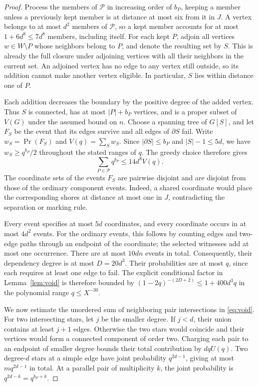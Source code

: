 \documentclass[11pt,reqno]{amsart}
\theoremstyle{remark}
\numberwithin{equation}{section}
\begin{document}
\begin{proof}
Process the members of $\mathcal P$ in increasing order of $b_P$,
keeping a member unless a previously kept member is at distance
at most six from it in $J$. A vertex belongs to at most $d^2$
members of $\mathcal P$, so a kept member accounts for at most
$1+6d^8\le7d^8$ members, including itself. For each kept $P$,
adjoin all vertices $w\in W\setminus P$ whose neighbors belong
to $P$, and denote the resulting set by $S$. This is already the
full closure under adjoining vertices with all their neighbors in
the current set. An adjoined vertex has no edge to any vertex
still outside, so its addition cannot make another vertex
eligible. In particular, $S$ lies within distance one of $P$.

Each addition decreases the boundary by the positive degree of
the added vertex. Thus $S$ is connected, has at most $|P|+b_P$
vertices, and is a proper subset of $V(G)$ under the assumed bound
on $n$. Choose a spanning tree of $G[S]$, and let $F_S$ be the
event that its edges survive and all edges of $\partial S$ fail.
Write $w_S=\Pr(F_S)$ and $V(q)=\sum_S w_S$. Since
$|\partial S|\le b_P$ and $|S|-1\le5d$, we have
$w_S\ge q^{b_P}/2$ throughout the stated ranges of $q$.
The greedy choice therefore gives
\begin{equation}\label{eq:upper-packing}
 \sum_{P\in\mathcal P}q^{b_P}\le14d^8V(q).
\end{equation}
The coordinate sets of the events $F_S$ are pairwise disjoint and
are disjoint from those of the ordinary component events. Indeed,
a shared coordinate would place the corresponding shores at
distance at most one in $J$, contradicting the separation or
marking rule.

Every event specifies at most $5d$ coordinates, and every
coordinate occurs in at most $4d^2$ events. For the ordinary
events, this follows by counting edges and two-edge paths through
an endpoint of the coordinate; the selected witnesses add at most
one occurrence. There are at most $10dn$ events in total.
Consequently, their dependency degree is at most $D=20d^3$.
Their probabilities are at most $q$, since each requires at least
one edge to fail. The explicit conditional factor in
Lemma~\ref{lem:void} is therefore bounded by
$(1-2q)^{-(2D+2)}\le1+400d^3q$ in the polynomial range
$q\le X^{-30}$.

We now estimate the unordered sum of neighboring pair
intersections in \eqref{eq:void}. For two intersecting stars, let
$j$ be the smaller degree. If $j<d$, their union contains at least
$j+1$ edges. Otherwise the two stars would coincide and their
vertices would form a connected component of order two.
Charging each pair to an endpoint of smaller degree bounds their
total contribution by $dqU(q)$. Two degree-$d$ stars at a simple
edge have joint probability $q^{2d-1}$, giving at most
$mq^{2d-1}$ in total. At a parallel pair of multiplicity $k$, the
joint probability is $q^{2d-k}=q^{b_P+k}$.


\end{proof}
\end{document}
